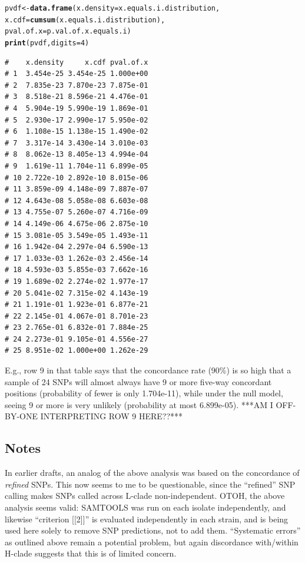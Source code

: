 \documentclass{article}\usepackage[]{graphicx}\usepackage[]{color}
\makeatletter
\newcommand{\hlnum}[1]{\textcolor[rgb]{0.686,0.059,0.569}{#1}}%
\newcommand{\hlstd}[1]{\textcolor[rgb]{0.345,0.345,0.345}{#1}}%
\newcommand{\hlkwb}[1]{\textcolor[rgb]{0.69,0.353,0.396}{#1}}%
\newcommand{\hlkwc}[1]{\textcolor[rgb]{0.333,0.667,0.333}{#1}}%
\newcommand{\hlkwd}[1]{\textcolor[rgb]{0.737,0.353,0.396}{\textbf{#1}}}%
\newenvironment{kframe}{%
 \def\at@end@of@kframe{}%
 \ifinner\ifhmode%
  \def\at@end@of@kframe{\end{minipage}}%
  \begin{minipage}{\columnwidth}%
 \fi\fi%
 \def\FrameCommand##1{\hskip\@totalleftmargin \hskip-\fboxsep
 \colorbox{shadecolor}{##1}\hskip-\fboxsep
     \hskip-\linewidth \hskip-\@totalleftmargin \hskip\columnwidth}%
 \MakeFramed {\advance\hsize-\width
   \@totalleftmargin\z@ \linewidth\hsize
   \@setminipage}}%
 {\par\unskip\endMakeFramed%
 \at@end@of@kframe}
\newenvironment{knitrout}{}{} %
\makeatother
\begin{document}
\begin{enumerate}
\begin{knitrout}\footnotesize
{}\color{fgcolor}\begin{kframe}
\begin{alltt}
\hlstd{pvdf} \hlkwb{<-} \hlkwd{data.frame}\hlstd{(}\hlkwc{x.density}\hlstd{=x.equals.i.distribution,}
                   \hlkwc{x.cdf}\hlstd{=}\hlkwd{cumsum}\hlstd{(x.equals.i.distribution),}
                   \hlkwc{pval.of.x}\hlstd{=p.val.of.x.equals.i)}
\hlkwd{print}\hlstd{(pvdf,} \hlkwc{digits}\hlstd{=}\hlnum{4}\hlstd{)}
\end{alltt}
\begin{verbatim}
#    x.density     x.cdf pval.of.x
# 1  3.454e-25 3.454e-25 1.000e+00
# 2  7.835e-23 7.870e-23 7.875e-01
# 3  8.518e-21 8.596e-21 4.476e-01
# 4  5.904e-19 5.990e-19 1.869e-01
# 5  2.930e-17 2.990e-17 5.950e-02
# 6  1.108e-15 1.138e-15 1.490e-02
# 7  3.317e-14 3.430e-14 3.010e-03
# 8  8.062e-13 8.405e-13 4.994e-04
# 9  1.619e-11 1.704e-11 6.899e-05
# 10 2.722e-10 2.892e-10 8.015e-06
# 11 3.859e-09 4.148e-09 7.887e-07
# 12 4.643e-08 5.058e-08 6.603e-08
# 13 4.755e-07 5.260e-07 4.716e-09
# 14 4.149e-06 4.675e-06 2.875e-10
# 15 3.081e-05 3.549e-05 1.493e-11
# 16 1.942e-04 2.297e-04 6.590e-13
# 17 1.033e-03 1.262e-03 2.456e-14
# 18 4.593e-03 5.855e-03 7.662e-16
# 19 1.689e-02 2.274e-02 1.977e-17
# 20 5.041e-02 7.315e-02 4.143e-19
# 21 1.191e-01 1.923e-01 6.877e-21
# 22 2.145e-01 4.067e-01 8.701e-23
# 23 2.765e-01 6.832e-01 7.884e-25
# 24 2.273e-01 9.105e-01 4.556e-27
# 25 8.951e-02 1.000e+00 1.262e-29
\end{verbatim}
\end{kframe}
\end{knitrout}

E.g., row 9 in that table says that the concordance rate (90\%) is so high that a sample of 24 SNPs will almost always have 9 or more five-way concordant positions (probability of fewer is only 1.704e-11), while under the null model, seeing 9 or more is very unlikely (probability at most 6.899e-05).  
***AM I OFF-BY-ONE INTERPRETING ROW 9 HERE??***  

\end{enumerate}

\subsection{Notes}

In earlier drafts, an analog of the above analysis was based on the concordance of \emph{refined} SNPs.  This now seems to me to be questionable, since the ``refined'' SNP calling makes SNPs called across L-clade non-independent. OTOH, the above analysis seems valid: SAMTOOLS was run on each isolate independently, and likewise ``criterion [[2]]'' is evaluated independently in each strain, and is being used here solely to remove SNP predictions, not to add them.  ``Systematic errors'' as outlined above remain a potential problem, but again discordance with/within H-clade suggests that this is of limited concern.
\end{document}
